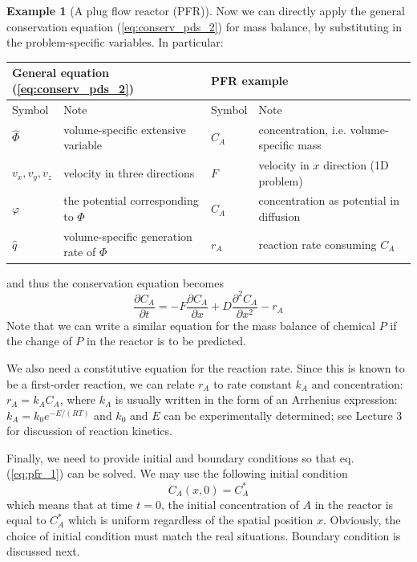 \documentclass[a4paper,11pt]{article}
\theoremstyle{definition}
\newtheorem{exmp}{Example}[section]
\begin{document}
\begin{exmp}[A plug flow reactor (PFR)]
\noindent Now we can directly apply the general conservation equation (\ref{eq:conserv_pds_2}) for mass balance,
by substituting in the problem-specific variables. In particular:

\begin{center}
    \begin{tabular}{ l l | l l}
    \hline
    \multicolumn{2}{l|}{General equation (\ref{eq:conserv_pds_2})} &   \multicolumn{2}{l}{PFR example} \\
    \hline
    Symbol & Note & Symbol & Note \\
    \hline
    $\hat{\Phi}$ & volume-specific extensive variable & $C_A$ & concentration, i.e. volume-specific mass \\
    $v_x, v_y, v_z$ & velocity in three directions & $F$ & velocity in $x$ direction (1D problem) \\
    $\varphi$ & the potential corresponding to $\Phi$ & $C_A$ & concentration as potential in diffusion \\
    $\hat{q}$ & volume-specific generation rate of $\Phi$ & $r_A$ & reaction rate consuming $C_A$ \\
    \hline
    \end{tabular}
\end{center}

\noindent and thus the conservation equation becomes
\begin{equation} \label{eq:pfr_1}
	\frac{\partial C_A}{\partial t} = - F \frac{\partial C_A}{\partial x} + D \frac{\partial^2 C_A}{\partial x^2} - r_A
\end{equation}
\noindent Note that we can write a similar equation for the mass balance of 
chemical $P$ if the change of $P$ in the reactor is to be predicted.

We also need a constitutive equation for the reaction rate. Since this is known to be
a first-order reaction, we can relate $r_A$ to rate constant $k_A$ and concentration:
$r_A = k_A C_A$, where $k_A$ is usually written in the form of an
Arrhenius expression: $k_A = k_0 e^{-E/(RT)}$ and $k_0$ and $E$ can be experimentally determined;
see Lecture 3 for discussion of reaction kinetics.

Finally, we need to provide initial and boundary conditions so that eq. (\ref{eq:pfr_1}) can be
solved. We may use the following initial condition
\[ C_A(x, 0) = C_A^* \]
which means that at time $t=0$, the initial concentration of $A$ in the reactor 
is equal to $C_A^*$ which is uniform regardless of the spatial position $x$. Obviously,
the choice of initial condition must match the real situations.
Boundary condition is discussed next.

\end{exmp}
\end{document}
